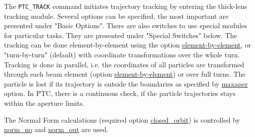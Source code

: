 The \texttt{PTC\_TRACK} command initiates trajectory tracking by
entering the thick-lens tracking module.  
Several options can be specified, the most important are presented under
"Basic Options". 
There are also switches to use special modules for particular
tasks. They are presented under "Special Switches" below.
The tracking can be done element-by-element using the option
\hyperlink{ELEMENT_BY_ELEMENT}{element-by-element}, or "turn-by-turn"
(default) with coordinate transformations over the whole turn. 
Tracking is done in parallel, i.e. the coordinates of all particles are
transformed through each beam element (option
\hyperlink{ELEMENT_BY_ELEMENT}{element-by-element}) or over full turns. 
The particle is lost if its trajectory is outside the boundaries as
specified by \hyperlink{MAXAPER}{maxaper} option. 
In PTC, there is a continuous check, if the particle trajectories stays
within the aperture limits.  

The Normal Form calculations (required option
\hyperlink{CLOSED_ORBIT}{closed\_orbit}) is controlled by
\hyperlink{NORM_NO}{norm\_no} and \hyperlink{NORM_OUT}{norm\_out} are
used.

